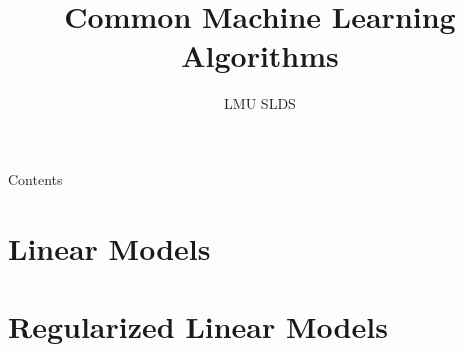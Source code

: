 



\title{Common Machine Learning Algorithms}
\author{LMU SLDS}
\date{}

\newcommand{\titlefigure}{figure_man/mckenzie_ai}
\newcommand{\titlefiguresize}{0.6}
\newcommand{\titlefiguresource}{https://www.vpnsrus.com/}







\lecturechapter{}

\begin{frame}{Contents}
  \tableofcontents
\end{frame}

\footnotesize

\section{Linear Models}


\section{Regularized Linear Models}


